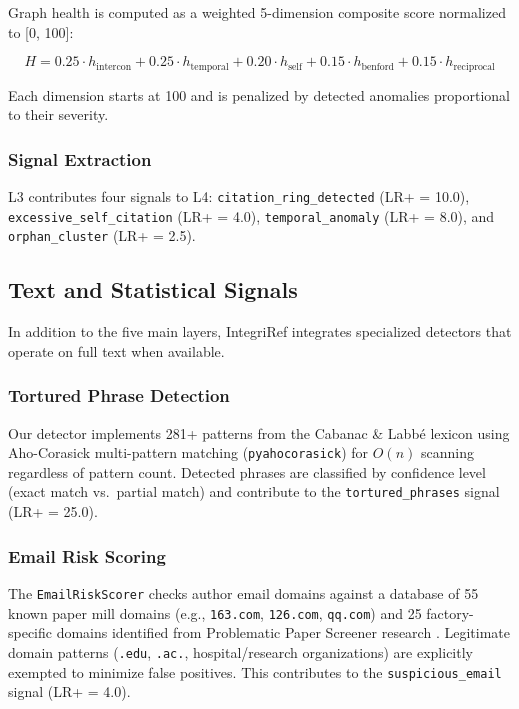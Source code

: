 \documentclass[sigconf,nonacm]{acmart}
\begin{document}
Graph health is computed as a weighted 5-dimension composite score normalized to [0, 100]:

\begin{equation}
H = 0.25 \cdot h_\text{intercon} + 0.25 \cdot h_\text{temporal} + 0.20 \cdot h_\text{self} + 0.15 \cdot h_\text{benford} + 0.15 \cdot h_\text{reciprocal}
\label{eq:graphhealth}
\end{equation}

Each dimension starts at 100 and is penalized by detected anomalies proportional to their severity.

\subsubsection{Signal Extraction}

L3 contributes four signals to L4: \texttt{citation\_ring\_detected} (LR+ = 10.0), \texttt{excessive\_self\_citation} (LR+ = 4.0), \texttt{temporal\_anomaly} (LR+ = 8.0), and \texttt{orphan\_cluster} (LR+ = 2.5).

\subsection{Text and Statistical Signals}
\label{sec:textstats}

In addition to the five main layers, IntegriRef integrates specialized detectors that operate on full text when available.

\subsubsection{Tortured Phrase Detection}

Our detector implements 281+ patterns from the Cabanac \& Labb\'{e} lexicon \cite{cabanac2021} using Aho-Corasick multi-pattern matching (\texttt{pyahocorasick}) for $O(n)$ scanning regardless of pattern count.
Detected phrases are classified by confidence level (exact match vs.\ partial match) and contribute to the \texttt{tortured\_phrases} signal (LR+ = 25.0).

\subsubsection{Email Risk Scoring}

The \texttt{EmailRiskScorer} checks author email domains against a database of 55 known paper mill domains (e.g., \texttt{163.com}, \texttt{126.com}, \texttt{qq.com}) and 25 factory-specific domains identified from Problematic Paper Screener research \cite{byrne2022}.
Legitimate domain patterns (\texttt{.edu}, \texttt{.ac.}, hospital/research organizations) are explicitly exempted to minimize false positives.
This contributes to the \texttt{suspicious\_email} signal (LR+ = 4.0).
\end{document}
